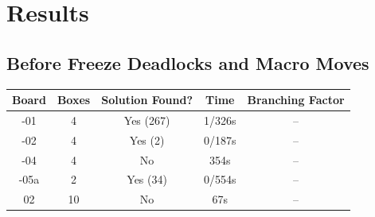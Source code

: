 \documentclass{article}
\begin{document}
\section{Results}
\subsection{Before Freeze Deadlocks and Macro Moves}
\begin{center}
\vspace{-5pt}
\footnotesize
\begin{tabular}{|c|c|c|c|c|}
    \hline
    Board & Boxes & Solution Found? & Time & Branching Factor\\
    \hline
    -01 & 4 & Yes (267) & 1/326s & --\\
    \hline
    -02 & 4 & Yes (2) & 0/187s & --\\
    \hline
    -04 & 4 & No & 354s & --\\
    \hline
    -05a & 2 & Yes (34) & 0/554s & --\\
    \hline
    02 & 10 & No & 67s & --\\
    \hline
\end{tabular}
\vspace{-5pt}
\end{center}








\end{document}
